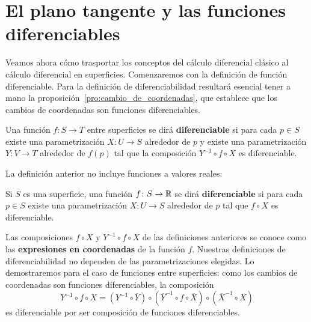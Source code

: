 
\chapter{El plano tangente y las funciones diferenciables}

Veamos ahora cómo trasportar los conceptos del cálculo diferencial clásico al
cálculo diferencial en superficies.  Comenzaremos con la definición de función
diferenciable. Para la definición de diferenciabilidad resultará esencial tener
a mano la proposición~\ref{pro:cambio_de_coordenadas}, que establece que los
cambios de coordenadas son funciones diferenciables.

\begin{definition}
	\label{def:diferenciable1}
	Una función $f\colon S\to T$ entre superficies se dirá
	\textbf{diferenciable} si para cada $p\in S$ existe una parametrización
	$X\colon U\to S$ alrededor de $p$ y existe una parametrización $Y\colon
	V\to T$ alrededor de $f(p)$ tal que la composición $Y^{-1}\circ f\circ X$
	es diferenciable.
\end{definition}

La definición anterior no incluye funciones a valores reales:

\begin{definition}
	Si $S$ es una superficie, 
	una función $f\colon S\to\mathbb{R}$ se dirá \textbf{diferenciable} si para cada $p\in S$ existe
	una parametrización $X\colon U\to S$ alrededor de $p$ tal que 
	$f\circ X$ es diferenciable.
\end{definition}

Las composiciones $f\circ X$ y $Y^{-1}\circ f\circ X$ de las definiciones
anteriores se conoce como las \textbf{expresiones en coordenadas} de la función
$f$.  Nuestras definiciones de diferenciabilidad no dependen de las
parametrizaciones elegidas. Lo demostraremos para el caso de funciones entre
superficies: como los cambios de coordenadas son funciones diferenciables, la
composición 
\[
	Y^{-1}\circ f\circ X=(Y^{-1}\circ\overline{Y})\circ (\overline{Y}^{-1}\circ f\circ\overline{X})\circ (\overline{X}^{-1}\circ X)
\]
es diferenciable por ser composición de funciones diferenciables.


